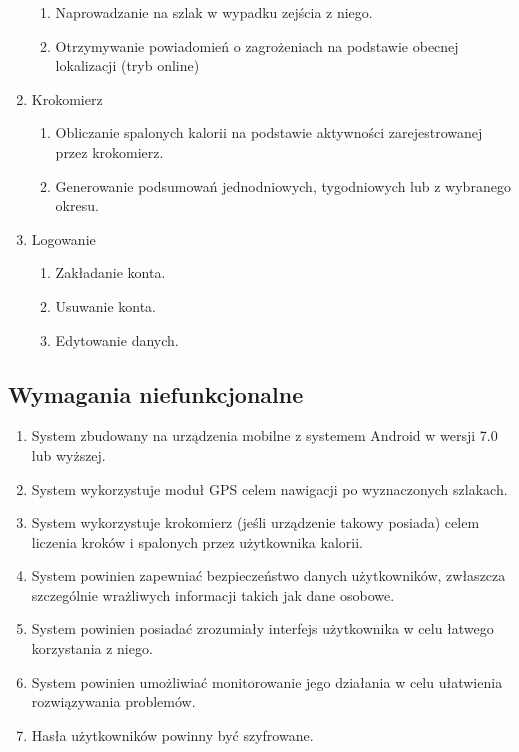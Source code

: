 \begin{enumerate}
\begin{enumerate}
            \item Naprowadzanie na szlak w wypadku zejścia z niego.
            \item Otrzymywanie powiadomień o zagrożeniach na podstawie obecnej lokalizacji (tryb online)
        \end{enumerate}
        \item Krokomierz
        \begin{enumerate}
            \item Obliczanie spalonych kalorii na podstawie aktywności zarejestrowanej przez krokomierz.
            \item Generowanie podsumowań jednodniowych, tygodniowych lub z wybranego okresu.
        \end{enumerate}
        \item Logowanie
        \begin{enumerate}
            \item Zakładanie konta.
            \item Usuwanie konta.
            \item Edytowanie danych.
        \end{enumerate}
    \end{enumerate}

    \subsection{Wymagania niefunkcjonalne}
    \begin{enumerate}
        \item System zbudowany na urządzenia mobilne z systemem Android w wersji 7.0 lub wyższej.
        \item System wykorzystuje moduł GPS celem nawigacji po wyznaczonych szlakach.
        \item System wykorzystuje krokomierz (jeśli urządzenie takowy posiada) celem liczenia kroków i spalonych przez użytkownika kalorii.
        \item System powinien zapewniać bezpieczeństwo danych użytkowników, zwłaszcza szczególnie wrażliwych informacji takich jak dane osobowe.
        \item System powinien posiadać zrozumiały interfejs użytkownika w celu łatwego korzystania z niego.
        \item System powinien umożliwiać monitorowanie jego działania w celu ułatwienia rozwiązywania problemów.
        \item Hasła użytkowników powinny być szyfrowane.
    \end{enumerate}

